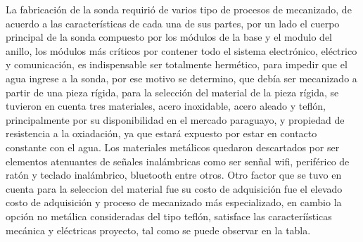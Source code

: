 La fabricaci\'on de la sonda requiri\'o de varios tipo de procesos de mecanizado, de acuerdo a las caracter\'isticas de cada una de sus partes, por un lado el cuerpo principal de la sonda compuesto por los m\'odulos de la base y el modulo del anillo, los m\'odulos más cr\'iticos por contener todo el sistema electr\'onico, el\'ectrico y comunicaci\'on, es indispensable ser totalmente herm\'etico, para impedir que el agua ingrese a la sonda, por ese motivo se determino, que deb\'ia ser mecanizado a partir de una pieza r\'igida, para la selecci\'on del material de la pieza rígida, se tuvieron en cuenta tres materiales, acero inoxidable, acero aleado y tefl\'on, principalmente por su disponibilidad en el mercado paraguayo, y propiedad de resistencia a la oxiadaci\'on, ya que estar\'a expuesto por estar en contacto constante con el agua. 
Los materiales met\'alicos quedaron descartados por ser elementos atenuantes de se\~nales inal\'ambricas como ser sen\~nal wifi, perif\'erico de rat\'on y teclado inal\'ambrico, bluetooth entre otros. Otro factor que se tuvo en cuenta para la seleccion del material fue su costo de adquisici\'on  fue el elevado costo de adquisici\'on y proceso de mecanizado m\'as especializado, en cambio la opción no met\'alica consideradas del tipo tefl\'on, satisface las caracterí\'isticas mec\'anica y el\'ectricas proyecto, tal como se puede observar en la tabla. 

